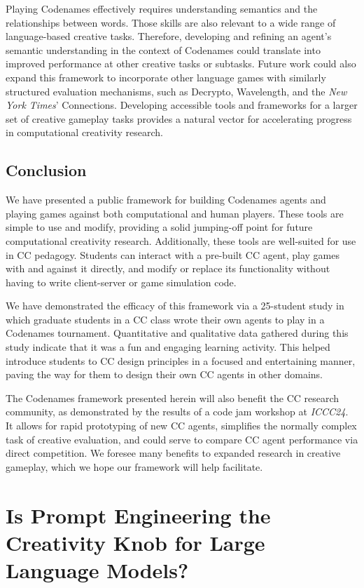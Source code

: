 \documentclass[phd,electronic,oneside,twosidetoc,letterpaper,chaptercenter,parttop,lof]{byumsphd}
\begin{document}
Playing Codenames effectively requires understanding semantics and the relationships between words. Those skills are also relevant to a wide range of language-based creative tasks. Therefore, developing and refining an agent's semantic understanding in the context of Codenames could translate into improved performance at other creative tasks or subtasks. Future work could also expand this framework to incorporate other language games with similarly structured evaluation mechanisms, such as Decrypto, Wavelength, and the \emph{New York Times}' Connections. Developing accessible tools and frameworks for a larger set of creative gameplay tasks provides a natural vector for accelerating progress in computational creativity research.

\section{Conclusion}
We have presented a public framework for building Codenames agents and playing games against both computational and human players. These tools are simple to use and modify, providing a solid jumping-off point for future computational creativity research. Additionally, these tools are well-suited for use in CC pedagogy. Students can interact with a pre-built CC agent, play games with and against it directly, and modify or replace its functionality without having to write client-server or game simulation code.

We have demonstrated the efficacy of this framework via a 25-student study in which graduate students in a CC class wrote their own agents to play in a Codenames tournament. Quantitative and qualitative data gathered during this study indicate that it was a fun and engaging learning activity. This helped introduce students to CC design principles in a focused and entertaining manner, paving the way for them to design their own CC agents in other domains.

The Codenames framework presented herein will also benefit the CC research community, as demonstrated by the results of a code jam workshop at \emph{ICCC24}. It allows for rapid prototyping of new CC agents, simplifies the normally complex task of creative evaluation, and could serve to compare CC agent performance via direct competition. We foresee many benefits to expanded research in creative gameplay, which we hope our framework will help facilitate.

\chapter{Is Prompt Engineering the Creativity Knob for Large Language Models?}
\end{document}

